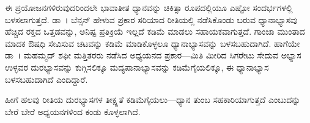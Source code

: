 ಈ ಪ್ರಯೋಜನಗಳಿರುವುದರಿಂದಲೇ ಭಾವಾತೀತ ಧ್ಯಾನವನ್ನು ಚಿಕಿತ್ಸಾ ರೂಪದಲ್ಲಿಯೂ ಎಷ್ಟೋ ಸಂದರ್ಭಗಳಲ್ಲಿ ಬಳಸಲಾಗುತ್ತದೆ. ಡಾ~। ಬೆನ್ಸನ್ ಹೇಳುವ ಪ್ರಕಾರ ಸರಿಯಾದ ರೀತಿಯಲ್ಲಿ ನಡೆಸಿಕೊಂಡು ಬರುವ ಧ್ಯಾನಾಭ್ಯಾಸವು ಹೆಚ್ಚಿದ ರಕ್ತದ ಒತ್ತಡವನ್ನು, ಅನಿಷ್ಟ ಪ್ರತಿಕ್ರಿಯೆ ಇಲ್ಲದೆ ಕಡಿಮೆ ಮಾಡಲು ಸಹಾಯಕವಾಗುತ್ತದೆ. ಗಾಂಜಾ ಮುಂತಾದ ಮಾದಕ ಔಷಧಿ ಸೇವಿಸುವ ಚಟವನ್ನು ಕಡಿಮೆ ಮಾಡಿಕೊಳ್ಳಲೂ ಧ್ಯಾನಾಭ್ಯಾಸವನ್ನು ಬಳಸಬಹುದಾಗಿದೆ. ಹಾಗೆಯೇ ಡಾ~। ಮಹಮ್ಮದ್ ಶಫೀ ಮತ್ತಿತರರು ನಡೆಸಿದ ಅಧ್ಯಯನದ ಪ್ರಕಾರ—ಮಿತಿ ಮೀರಿದ ಸಿಗರೇಟು ಸೇದುವ ಅಭ್ಯಾಸ ಉಳ್ಳವರ ದುರಭ್ಯಾಸವನ್ನು ಕುಗ್ಗಿಸಲಿಕ್ಕೂ ಮದ್ಯಪಾನಾಭ್ಯಾಸವನ್ನು ಕಡಿಮೆಗೈಯಲಿಕ್ಕೂ, ಈ ಧ್ಯಾನಾಭ್ಯಾಸ ಬಳಸಬಹುದಾಗಿದೆ ಎಂದಿದ್ದಾರೆ.

ಹೀಗೆ ಹಲವು ರೀತಿಯ ದುರಭ್ಯಾಸಗಳ ತೀಕ್ಷ್ಣತೆ ಕಡಿಮೆಗೈಯಲು—ಧ್ಯಾನ ತುಂಬ ಸಹಕಾರಿಯಾಗುತ್ತದೆ ಎಂಬುದನ್ನು ಬೇರೆ ಬೇರೆ ಅಧ್ಯಯನಗಳಿಂದ ಕಂಡು ಕೊಳ್ಳಲಾಗಿದೆ.


